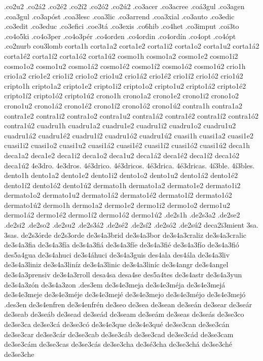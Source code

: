 {.co2u2
.co2á2
.co2é2
.co2í2
.co2ó2
.co2ú2
.co3acer
.co3acree
.coá3gul
.co3agen
.coa3gul
.co3apóst
.coa3lesc
.coa3lic
.co3arrend
.coa3xial
.co3auto
.co3edic
.co3edit
.co3educ
.co3efici
.coe3tá
.co3exis
.co6hib
.co4het
.co3imput
.coi3to
.co4o5ki
.co4o3per
.co4o3pér
.co4orden
.co4ordin
.co4ordín
.co4opt
.co4ópt
.co2nurb
cou3lomb
corta1h
corta1a2 corta1e2 corta1i2 corta1o2 corta1u2
corta1á2 corta1é2 corta1í2 corta1ó2 corta1ú2
cosmo1h
cosmo1a2 cosmo1e2 cosmo1i2 cosmo1o2 cosmo1u2
cosmo1á2 cosmo1é2 cosmo1í2 cosmo1ó2 cosmo1ú2
crio1h
crio1a2 crio1e2 crio1i2 crio1o2 crio1u2
crio1á2 crio1é2 crio1í2 crio1ó2 crio1ú2
cripto1h
cripto1a2 cripto1e2 cripto1i2 cripto1o2 cripto1u2
cripto1á2 cripto1é2 cripto1í2 cripto1ó2 cripto1ú2
crono1h
crono1a2 crono1e2 crono1i2 crono1o2 crono1u2
crono1á2 crono1é2 crono1í2 crono1ó2 crono1ú2
contra1h
contra1a2 contra1e2 contra1i2 contra1o2 contra1u2
contra1á2 contra1é2 contra1í2 contra1ó2 contra1ú2
cuadru1h
cuadru1a2 cuadru1e2 cuadru1i2 cuadru1o2 cuadru1u2
cuadru1á2 cuadru1é2 cuadru1í2 cuadru1ó2 cuadru1ú2
cuasi1h
cuasi1a2 cuasi1e2 cuasi1i2 cuasi1o2 cuasi1u2
cuasi1á2 cuasi1é2 cuasi1í2 cuasi1ó2 cuasi1ú2
deca1h
deca1a2 deca1e2 deca1i2 deca1o2 deca1u2
deca1á2 deca1é2 deca1í2 deca1ó2 deca1ú2
4e3dro.
4e3dros.
4é3drico.
4é3dricos.
4é3drica.
4é3dricas.
4í3ble.
4í3bles.
dento1h
dento1a2 dento1e2 dento1i2 dento1o2 dento1u2
dento1á2 dento1é2 dento1í2 dento1ó2 dento1ú2
dermato1h
dermato1a2 dermato1e2 dermato1i2 dermato1o2 dermato1u2
dermato1á2 dermato1é2 dermato1í2 dermato1ó2 dermato1ú2
dermo1h
dermo1a2 dermo1e2 dermo1i2 dermo1o2 dermo1u2
dermo1á2 dermo1é2 dermo1í2 dermo1ó2 dermo1ú2
.de2s1h
.de2s3a2
.de2se2
.de2si2
.de2so2
.de2su2
.de2s3á2
.de2sé2
.de2sí2
.de2só2
.de2sú2
deca2i3mient
3sa.
3sas.
de2s3órde
de2s3orde
de3s4a3brid
de3s4a3bor
de3s4a3craliz
de3s4a3cralic
de3s4a3fia
de3s4a3fía
de3s4a3fiá
de3s4a3fíe
de3s4a3fié
de3s4a3fío
de3s4a3fió
des5a4gua
de3s4ahuci
de3s4áhuci
de3s4a3guis
des4ala
des4ála
de3s4a3liv
de3s4a3liniz
de3s4a3liníz
de3s4a3linic
de3s4a3liníc
de3s4angr
de3s4angel
de3s4a3prensiv
de3s4a3rroll
desa4sa
desa4se
des5a4tes
de3s4astr
de3s4a3yun
de3s4a3zón
de3s4a3zon
.des3em
de3s4e3meja
de3s4e3méja
de3s4e3mejá
de3s4e3meje
de3s4e3méje
de3s4e3mejé
de3s4e3mejo
de3s4e3méjo
de3s4e3mejó
.des3en
de3s4enfren
de3s4enfrén
de3seo
de3sea
de3sean
de3seán
de3sear
de3seár
de3seab
de3seáb
de3sead
de3seád
de3seam
de3seám
de3seas
de3seás
de3se3co
de3se3ca
de3se3cá
de3se3có
de3s4e3que
de3s4e3qué
de3se3can
de3se3cán
de3se3car
de3se3cár
de3se3cab
de3se3cáb
de3se3cad
de3se3cád
de3se3cam
de3se3cám
de3se3cas
de3se3cás
de3se3cha
de3sé3cha
de3se3chá
de3se3ché
de3se3che
}

